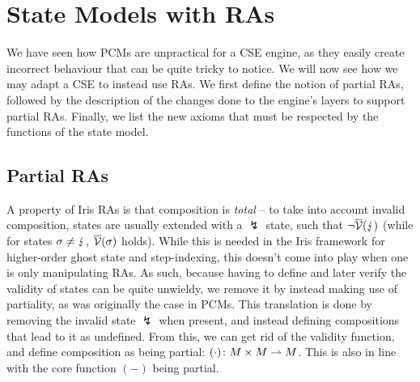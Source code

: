 \section{State Models with RAs} \label{sec:theory-state-model-ras}

We have seen how PCMs are unpractical for a CSE engine, as they easily create incorrect behaviour that can be quite tricky to notice. We will now see how we may adapt a CSE to instead use RAs. We first define the notion of partial RAs, followed by the description of the changes done to the engine's layers to support partial RAs. Finally, we list the new axioms that must be respected by the functions of the state model.

\subsection{Partial RAs}

A property of Iris RAs is that composition is \emph{total} -- to take into account invalid composition, states are usually extended with a $\lightning$ state, such that $\neg \overline{\cal V}(\lightning)$ (while for states $\sigma\neq\lightning$, $\overline{\cal V}(\sigma)$ holds). While this is needed in the Iris framework for higher-order ghost state and step-indexing, this doesn't come into play when one is only manipulating RAs. As such, because having to define and later verify the validity of states can be quite unwieldy, we remove it by instead making use of partiality, as was originally the case in PCMs. This translation is done by removing the invalid state $\lightning$ when present, and instead defining compositions that lead to it as undefined. From this, we can get rid of the validity function, and define composition as being partial: $(\cdot)\colon M\times M\rightharpoonup M$. This is also in line with the core function $(-)$ being partial.

